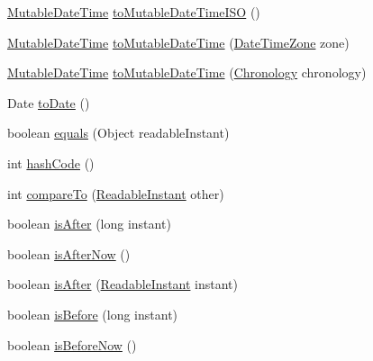 \begin{DoxyCompactItemize}
\item 
\hyperlink{classorg_1_1joda_1_1time_1_1_mutable_date_time}{Mutable\-Date\-Time} \hyperlink{classorg_1_1joda_1_1time_1_1base_1_1_abstract_instant_ab742be4b2c8ed0ce4b84f47469b15843}{to\-Mutable\-Date\-Time\-I\-S\-O} ()
\item 
\hyperlink{classorg_1_1joda_1_1time_1_1_mutable_date_time}{Mutable\-Date\-Time} \hyperlink{classorg_1_1joda_1_1time_1_1base_1_1_abstract_instant_a16696a2b44e4a83e048bbddd7c188336}{to\-Mutable\-Date\-Time} (\hyperlink{classorg_1_1joda_1_1time_1_1_date_time_zone}{Date\-Time\-Zone} zone)
\item 
\hyperlink{classorg_1_1joda_1_1time_1_1_mutable_date_time}{Mutable\-Date\-Time} \hyperlink{classorg_1_1joda_1_1time_1_1base_1_1_abstract_instant_a67d8545dc168806e36f9764b25857a19}{to\-Mutable\-Date\-Time} (\hyperlink{classorg_1_1joda_1_1time_1_1_chronology}{Chronology} chronology)
\item 
Date \hyperlink{classorg_1_1joda_1_1time_1_1base_1_1_abstract_instant_ac593da21f3d37d359de7609f31839e98}{to\-Date} ()
\item 
boolean \hyperlink{classorg_1_1joda_1_1time_1_1base_1_1_abstract_instant_ac308a7d7056379738213cc6def86034d}{equals} (Object readable\-Instant)
\item 
int \hyperlink{classorg_1_1joda_1_1time_1_1base_1_1_abstract_instant_a493a1ef62a31c7f30539189c8c6b6734}{hash\-Code} ()
\item 
int \hyperlink{classorg_1_1joda_1_1time_1_1base_1_1_abstract_instant_a902967e6ff7f6156a7504a4a8bbd3394}{compare\-To} (\hyperlink{interfaceorg_1_1joda_1_1time_1_1_readable_instant}{Readable\-Instant} other)
\item 
boolean \hyperlink{classorg_1_1joda_1_1time_1_1base_1_1_abstract_instant_a4549d132ea6b75ab45c325a6effaab49}{is\-After} (long instant)
\item 
boolean \hyperlink{classorg_1_1joda_1_1time_1_1base_1_1_abstract_instant_adb6c32a905be792aa031d2d8f9e62286}{is\-After\-Now} ()
\item 
boolean \hyperlink{classorg_1_1joda_1_1time_1_1base_1_1_abstract_instant_ac0150d58cae771a911cad53ad11cf72c}{is\-After} (\hyperlink{interfaceorg_1_1joda_1_1time_1_1_readable_instant}{Readable\-Instant} instant)
\item 
boolean \hyperlink{classorg_1_1joda_1_1time_1_1base_1_1_abstract_instant_a9033213fd13ac00c6a257daa4fb8c2b5}{is\-Before} (long instant)
\item 
boolean \hyperlink{classorg_1_1joda_1_1time_1_1base_1_1_abstract_instant_ab7e71b1495b209dd473d60380d7a148f}{is\-Before\-Now} ()

\end{DoxyCompactItemize}
